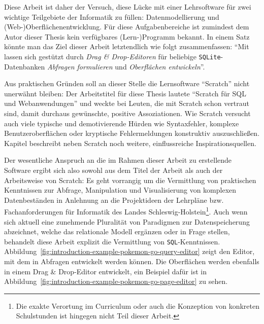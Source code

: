 Diese Arbeit ist daher der Versuch, diese Lücke mit einer Lehrsoftware für zwei wichtige Teilgebiete der Informatik zu füllen: Datenmodellierung und (Web-)Ober\-flächen\-ent\-wick\-lung. Für diese Aufgabenbereiche ist zumindest dem Autor dieser Thesis kein verfügbares (Lern-)Programm bekannt. In einem Satz könnte man das Ziel dieser Arbeit letztendlich wie folgt zusammenfassen: "`Mit \idename{} lassen sich gestützt durch \textit{Drag \& Drop-Editoren} für beliebige \texttt{SQLite}-Datenbanken \textit{Abfragen formulieren} und \textit{Oberflächen entwickeln}"'.


Aus praktischen Gründen soll an dieser Stelle die Lernsoftware "`Scratch"' nicht unerwähnt bleiben: Der Arbeitstitel für diese Thesis lautete "`Scratch für SQL und Webanwendungen"' und weckte bei Leuten, die mit Scratch schon vertraut sind, damit durchaus gewünschte, positive Assoziationen. Wie Scratch versucht auch \idename{} viele typische und demotivierende Hürden wie Syntaxfehler, komplexe Benutzeroberflächen oder kryptische Fehlermeldungen konstruktiv auszuschließen. Kapitel  beschreibt neben Scratch noch weitere, einflussreiche Inspirationsquellen.

Der wesentliche Anspruch an die im Rahmen dieser Arbeit zu erstellende Software ergibt sich also sowohl aus dem Titel der Arbeit als auch der Arbeitsweise von Scratch: Es geht vorrangig um die Vermittlung von praktischen Kenntnissen zur Abfrage, Manipulation und Visualisierung von komplexen Datenbeständen in Anlehnung an die Projektideen der Lehrpläne \cite{lehrplan-inf-sek-1} bzw. Fachanforderungen \cite{lehrplan-inf-sek-2} für Informatik des Landes Schleswig-Holstein\footnote{Die exakte Verortung im Curriculum oder auch die Konzeption von konkreten Schulstunden ist hingegen nicht Teil dieser Arbeit.}. Auch wenn sich aktuell eine zunehmende Pluralität von Paradigmen zur Datenspeicherung abzeichnet, welche das relationale Modell ergänzen oder in Frage stellen, behandelt diese Arbeit explizit die Vermittlung von \texttt{SQL}-Kenntnissen. Abbildung~\ref{fig:introduction-example-pokemon-go-query-editor} zeigt den Editor, mit dem in \idename{} Abfragen entwickelt werden können. Die Oberflächen werden ebenfalls in einem Drag \& Drop-Editor entwickelt, ein Beispiel dafür ist in Abbildung~\ref{fig:introduction-example-pokemon-go-page-editor} zu sehen.

